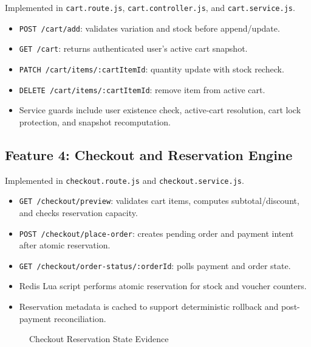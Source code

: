 Implemented in \texttt{cart.route.js}, \texttt{cart.controller.js}, and \texttt{cart.service.js}.
\begin{itemize}
    \item \texttt{POST /cart/add}: validates variation and stock before append/update.
    \item \texttt{GET /cart}: returns authenticated user's active cart snapshot.
    \item \texttt{PATCH /cart/items/:cartItemId}: quantity update with stock recheck.
    \item \texttt{DELETE /cart/items/:cartItemId}: remove item from active cart.
    \item Service guards include user existence check, active-cart resolution, cart lock protection, and snapshot recomputation.
\end{itemize}

\subsection{Feature 4: Checkout and Reservation Engine}

Implemented in \texttt{checkout.route.js} and \texttt{checkout.service.js}.
\begin{itemize}
    \item \texttt{GET /checkout/preview}: validates cart items, computes subtotal/discount, and checks reservation capacity.
    \item \texttt{POST /checkout/place-order}: creates pending order and payment intent after atomic reservation.
    \item \texttt{GET /checkout/order-status/:orderId}: polls payment and order state.
    \item Redis Lua script performs atomic reservation for stock and voucher counters.
    \item Reservation metadata is cached to support deterministic rollback and post-payment reconciliation.
\end{itemize}

\begin{figure}[H]
\centering
{}
\caption{Checkout Reservation State Evidence}
\label{fig:impl-checkout-reservation-evidence}
\end{figure}

